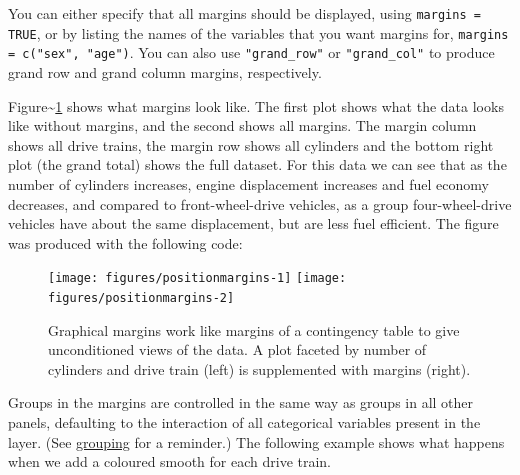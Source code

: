 You can either specify that all margins should be displayed, using
\texttt{margins = TRUE}, or by listing the names of the variables that
you want margins for, \texttt{margins = c("sex", "age")}. You can also
use \texttt{"grand\_row"} or \texttt{"grand\_col"} to produce grand row
and grand column margins, respectively.

Figure\textasciitilde{}\ref{fig:margins} shows what margins look like.
The first plot shows what the data looks like without margins, and the
second shows all margins. The margin column shows all drive trains, the
margin row shows all cylinders and the bottom right plot (the grand
total) shows the full dataset. For this data we can see that as the
number of cylinders increases, engine displacement increases and fuel
economy decreases, and compared to front-wheel-drive vehicles, as a
group four-wheel-drive vehicles have about the same displacement, but
are less fuel efficient. The figure was produced with the following
code:

\begin{Shaded}
\begin{Highlighting}[]
\StringTok{ } 
\StringTok{  }\NormalTok{(} \NormalTok{, } 
\StringTok{ }\StringTok{ }
\StringTok{ }\StringTok{ } 
\end{Highlighting}
\end{Shaded}

\begin{figure}
\texttt{[image: figures/positionmargins-1]} \texttt{[image: figures/positionmargins-2]} \caption{Graphical margins work like margins of a contingency table to give unconditioned views of the data.  A plot faceted by number of cylinders and drive train (left) is supplemented with margins (right).\label{fig:margins}}
\end{figure}

Groups in the margins are controlled in the same way as groups in all
other panels, defaulting to the interaction of all categorical variables
present in the layer. (See \hyperref[sub:grouping]{grouping} for a
reminder.) The following example shows what happens when we add a
coloured smooth for each drive train.

